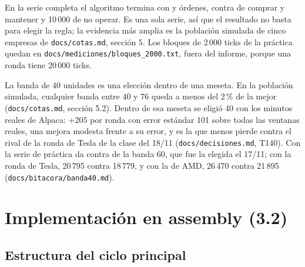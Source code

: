 \documentclass[11pt,a4paper]{article}
\newcommand{\arch}[1]{\texttt{#1}}
\begin{document}
En la serie completa el algoritmo termina con \cifraPatrimonioVeinte{} y \cifraOrdenesVeinte{} órdenes, contra \cifraCymVeinte{} de comprar y mantener y 10\,000 de no operar. Es una sola serie, así que el resultado no basta para elegir la regla; la evidencia más amplia es la población simulada de cinco empresas de \arch{docs/cotas.md}, sección 5. Los bloques de 2\,000 ticks de la práctica quedan en \arch{docs/mediciones/bloques\_2000.txt}, fuera del informe, porque una ronda tiene 20\,000 ticks.

La banda de 40 unidades es una elección dentro de una meseta. En la población simulada, cualquier banda entre 40 y 76 queda a menos del 2\,\% de la mejor (\arch{docs/cotas.md}, sección 5.2). Dentro de esa meseta se eligió 40 con los minutos reales de Alpaca: $+205$ por ronda con error estándar 101 sobre todas las ventanas reales, una mejora modesta frente a su error, y es la que menos pierde contra el rival de la ronda de Tesla de la clase del 18/11 (\arch{docs/decisiones.md}, T140). Con la serie de práctica da \cifraPatrimonioVeinte{} contra \cifraPatrimonioBandaSesentaVeinte{} de la banda 60, que fue la elegida el 17/11; con la ronda de Tesla, 20\,795 contra 18\,779, y con la de AMD, 26\,470 contra 21\,895 (\arch{docs/bitacora/banda40.md}).

\section{Implementación en assembly (3.2)}

\subsection{Estructura del ciclo principal}
\end{document}
